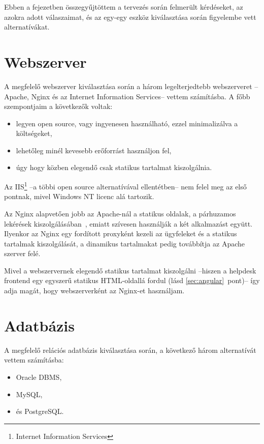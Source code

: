 Ebben a fejezetben összegyűjtöttem a tervezés során felmerült kérdéseket, az azokra adott válaszaimat, és az egy-egy eszköz kiválasztása során figyelembe vett alternatívákat.



\section{Webszerver}
A megfelelő webszerver kiválasztása során a három legelterjedtebb\cite{W3Techs_Usage_statistics_of_webservers} webszerveret --Apache, Nginx és az Internet Information Services-- vettem számításba. A főbb szempontjaim a következők voltak:
\begin{itemize}
	\item legyen open source, vagy ingyenesen használható, ezzel minimalizálva a költségeket,
	\item lehetőleg minél kevesebb erőforrást használjon fel,
	\item úgy hogy közben elegendő csak statikus tartalmat kiszolgálnia.
\end{itemize}

Az IIS\footnote{Internet Information Services} --a többi open source alternatívával ellentétben-- nem felel meg az első pontnak, mivel Windows NT licenc alá tartozik.

Az Nginx alapvetően jobb az Apache-nál a statikus oldalak, a párhuzamos lekérések kiszolgálásában~\cite{nginx_performance}, emiatt szívesen használják a két alkalmazást együtt. Ilyenkor az Nginx egy fordított proxyként kezeli az ügyfeleket és a statikus tartalmak kiszolgálását, a dinamikus tartalmakat pedig továbbítja az Apache szerver felé.

Mivel a webszervernek elegendő statikus tartalmat kiszolgálni --hiszen a helpdesk frontend egy egyszerű statikus HTML-oldallá fordul (lásd \ref{sec:angular}~pont)-- így adja magát, hogy webszerverként az Nginx-et használjam.




\section{Adatbázis}
A megfelelő relációs adatbázis kiválasztása során, a következő három alternatívát vettem számításba:
\begin{itemize}
	\item Oracle DBMS,
	\item MySQL,
	\item és PostgreSQL.
\end{itemize}

